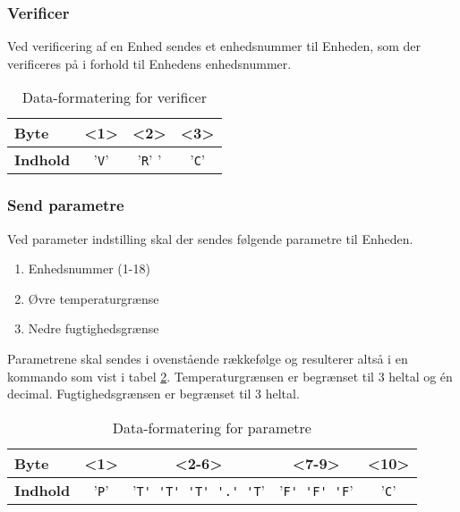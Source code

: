 \subsubsection{Verificer}

Ved verificering af en Enhed sendes et enhedsnummer til Enheden, som der verificeres på i forhold til Enhedens enhedsnummer.

\begin{table}[h]
	\caption{Data-formatering for verificer}
	\centering
	\begin{tabular}{|l|c|c|c|}
		\hline 
		\textbf{Byte} & \textbf{<1>} & \textbf{<2>} & \textbf{<3>}   \\ 
		\hline 
		\textbf{Indhold} & '\verb+V+' & '\verb+R+' ' & '\verb+C+'\\ 
		\hline 
	\end{tabular} 
	\label{table:SWProtokol-verificer}
\end{table}

\subsubsection{Send parametre}

Ved parameter indstilling skal der sendes følgende parametre til Enheden.

\begin{enumerate}
	\item Enhedsnummer (1-18)
	\item Øvre temperaturgrænse
	\item Nedre fugtighedsgrænse
\end{enumerate}

Parametrene skal sendes i ovenstående rækkefølge og resulterer altså i en kommando som vist i tabel \ref{table:SWProtokol-para}. Temperaturgrænsen er begrænset til 3 heltal og én decimal. Fugtighedsgrænsen er begrænset til 3 heltal.

\begin{table}[h]
	\caption{Data-formatering for parametre}
	\centering
	\begin{tabular}{|l|c|c|c|c|}
		\hline 
		\textbf{Byte} & \textbf{<1>} & \textbf{<2-6>} & \textbf{<7-9>} & \textbf{<10>} \\ 
		\hline 
		\textbf{Indhold} & '\verb+P+' & '\verb+T' 'T' 'T' '.' 'T+' & '\verb+F' 'F' 'F+' & '\verb+C+' \\ 
		\hline 
	\end{tabular} 
	\label{table:SWProtokol-para}
\end{table}


